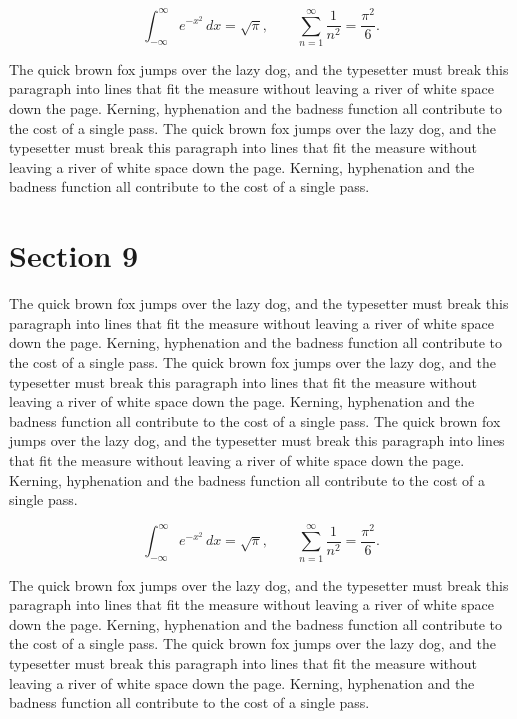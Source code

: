 \documentclass{article}
\begin{document}
\begin{equation}
\int_{-\infty}^{\infty} e^{-x^{2}}\,dx = \sqrt{\pi}, \qquad
\sum_{n=1}^{\infty} \frac{1}{n^{2}} = \frac{\pi^{2}}{6}.
\end{equation}

The quick brown fox jumps over the lazy dog, and the typesetter must break this paragraph into lines that fit the measure without leaving a river of white space down the page. Kerning, hyphenation and the badness function all contribute to the cost of a single pass. The quick brown fox jumps over the lazy dog, and the typesetter must break this paragraph into lines that fit the measure without leaving a river of white space down the page. Kerning, hyphenation and the badness function all contribute to the cost of a single pass. 
\section{Section 9}
The quick brown fox jumps over the lazy dog, and the typesetter must break this paragraph into lines that fit the measure without leaving a river of white space down the page. Kerning, hyphenation and the badness function all contribute to the cost of a single pass. The quick brown fox jumps over the lazy dog, and the typesetter must break this paragraph into lines that fit the measure without leaving a river of white space down the page. Kerning, hyphenation and the badness function all contribute to the cost of a single pass. The quick brown fox jumps over the lazy dog, and the typesetter must break this paragraph into lines that fit the measure without leaving a river of white space down the page. Kerning, hyphenation and the badness function all contribute to the cost of a single pass. 

\begin{equation}
\int_{-\infty}^{\infty} e^{-x^{2}}\,dx = \sqrt{\pi}, \qquad
\sum_{n=1}^{\infty} \frac{1}{n^{2}} = \frac{\pi^{2}}{6}.
\end{equation}

The quick brown fox jumps over the lazy dog, and the typesetter must break this paragraph into lines that fit the measure without leaving a river of white space down the page. Kerning, hyphenation and the badness function all contribute to the cost of a single pass. The quick brown fox jumps over the lazy dog, and the typesetter must break this paragraph into lines that fit the measure without leaving a river of white space down the page. Kerning, hyphenation and the badness function all contribute to the cost of a single pass. 
\end{document}
